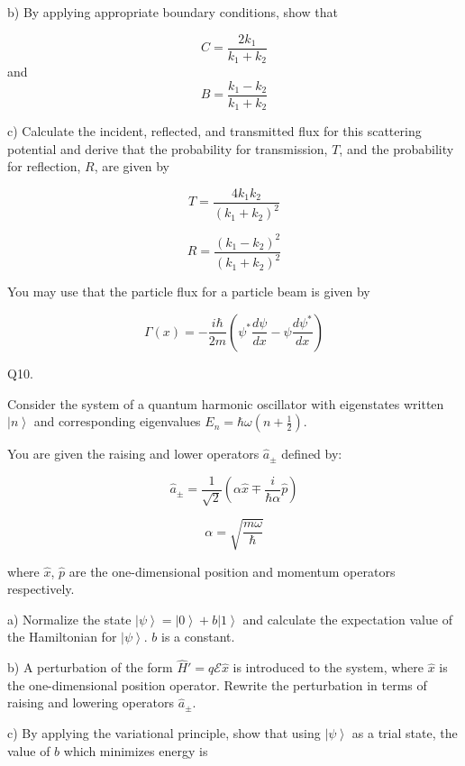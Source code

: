 \documentclass[a4paper,11pt]{article}
\begin{document}
\noindent b) By applying appropriate boundary conditions, show that 

\[ C = \frac{2k_{1}}{k_{1}+k_{2}} \] and \[ B = \frac{k_{1}-k_{2}}{k_{1}+k_{2}} \]

\noindent c) Calculate the incident, reflected, and transmitted flux for this scattering potential and derive that the probability for transmission, \( T \), and the probability for reflection, \( R \), are given by 

\[ T = \frac{4k_{1}k_{2}}{(k_{1}+k_{2})^{2}} \]

\[ R = \frac{(k_{1}-k_{2})^{2}}{(k_{1}+k_{2})^{2}} \]

\noindent You may use that the particle flux for a particle beam is given by 

\[ \Gamma(x) = -\frac{i\hbar}{2m} \left(\psi^{*}\frac{d\psi}{dx} - \psi\frac{d\psi^{*}}{dx} \right) \]

\noindent Q10.

\noindent Consider the system of a quantum harmonic oscillator with eigenstates written \( \left| n \right> \) and corresponding eigenvalues \( E_{n} = \hbar\omega(n+\frac{1}{2}) \).

\noindent You are given the raising and lower operators \( \hat{a}_{\pm} \) defined by:

\[ \hat{a}_{\pm} = \frac{1}{\sqrt{2}}(\alpha \hat{x} \mp \frac{i}{\hbar\alpha} \hat{p}) \]

\[ \alpha = \sqrt{\frac{m\omega}{\hbar}} \]

\noindent where \( \hat{x} \), \( \hat{p} \) are the one-dimensional position and momentum operators respectively.

\medskip

\noindent a) Normalize the state \( \left| \psi \right> =  \left| 0 \right> + b \left| 1 \right> \) and calculate the expectation value of the Hamiltonian for \( \left| \psi \right> \). \( b \) is a constant.

\medskip

\noindent b) A perturbation of the form \( \hat{H}' = q \mathcal{E} \hat{x} \) is introduced to the system, where \( \hat{x} \) is the one-dimensional position operator. Rewrite the perturbation in terms of raising and lowering operators \( \hat{a}_{\pm} \).

\medskip

\noindent c) By applying the variational principle, show that using \( \left| \psi \right> \) as a trial state, the value of \( b \) which minimizes energy is 
\end{document}
